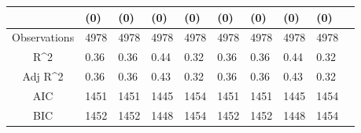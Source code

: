 \documentclass{article}
\begin{document}
\begin{table}[H]
\begin{tabular}{|clllllllll|}
   & (0) & (0) & (0) & (0) & (0) & (0) & (0) & (0) & \\ 
  \hline 
 Observations & 4978 & 4978 & 4978 & 4978 & 4978 & 4978 & 4978 & 4978 & \\ 
  R^2 & 0.36 & 0.36 & 0.44 & 0.32 & 0.36 & 0.36 & 0.44 & 0.32 & \\ 
  Adj R^2 & 0.36 & 0.36 & 0.43 & 0.32 & 0.36 & 0.36 & 0.43 & 0.32 & \\ 
  AIC & 1451 & 1451 & 1445 & 1454 & 1451 & 1451 & 1445 & 1454 & \\ 
  BIC & 1452 & 1452 & 1448 & 1454 & 1452 & 1452 & 1448 & 1454 & \\ 
   \hline
\end{tabular}
 
\end{table}


\newpage
\end{document}
